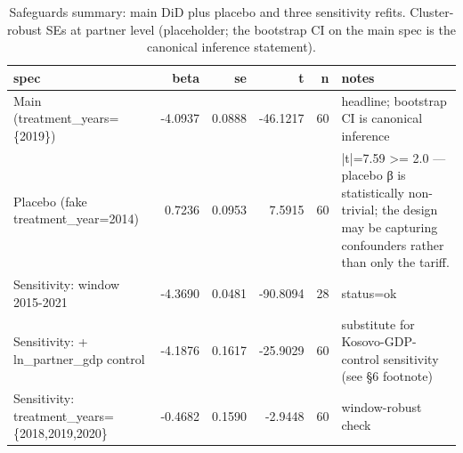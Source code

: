 \begin{table}
\caption{Safeguards summary: main DiD plus placebo and three sensitivity refits. Cluster-robust SEs at partner level (placeholder; the bootstrap CI on the main spec is the canonical inference statement).}
\label{tbl:ch5-safeguards-summary}
\begin{tabular}{lrrrrl}
\toprule
spec & beta & se & t & n & notes \\
\midrule
Main (treatment\_years=\{2019\}) & -4.0937 & 0.0888 & -46.1217 & 60 & headline; bootstrap CI is canonical inference \\
Placebo (fake treatment\_year=2014) & 0.7236 & 0.0953 & 7.5915 & 60 & |t|=7.59 >= 2.0 — placebo β is statistically non-trivial; the design may be capturing confounders rather than only the tariff. \\
Sensitivity: window 2015-2021 & -4.3690 & 0.0481 & -90.8094 & 28 & status=ok \\
Sensitivity: + ln\_partner\_gdp control & -4.1876 & 0.1617 & -25.9029 & 60 & substitute for Kosovo-GDP-control sensitivity (see §6 footnote) \\
Sensitivity: treatment\_years=\{2018,2019,2020\} & -0.4682 & 0.1590 & -2.9448 & 60 & window-robust check \\
\bottomrule
\end{tabular}
\end{table}
